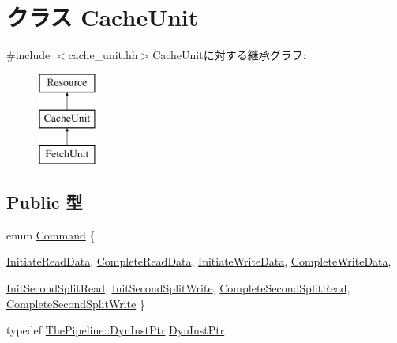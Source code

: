 \hypertarget{classCacheUnit}{
\section{クラス CacheUnit}
\label{classCacheUnit}
}


{\ttfamily \#include $<$cache\_\-unit.hh$>$}CacheUnitに対する継承グラフ:\begin{figure}[H]
\begin{center}
\leavevmode
\includegraphics[height=3cm]{classCacheUnit}
\end{center}
\end{figure}
\subsection*{Public 型}
\begin{DoxyCompactItemize}
\item 
enum \hyperlink{classCacheUnit_a2afce0a47a93eee73a314d53e4890153}{Command} \{ \par
\hyperlink{classCacheUnit_a2afce0a47a93eee73a314d53e4890153a073e15b510a5603d2befcbe896bd735e}{InitiateReadData}, 
\hyperlink{classCacheUnit_a2afce0a47a93eee73a314d53e4890153a4a1b5faa1ef065d02de5e8c06d8ea9c3}{CompleteReadData}, 
\hyperlink{classCacheUnit_a2afce0a47a93eee73a314d53e4890153aef4b28c5f1a2120dfb93f7613b5e12d7}{InitiateWriteData}, 
\hyperlink{classCacheUnit_a2afce0a47a93eee73a314d53e4890153a7a09943676cd675c7fc3ab19ad0c3d9a}{CompleteWriteData}, 
\par
\hyperlink{classCacheUnit_a2afce0a47a93eee73a314d53e4890153aaf47086f5466118f146d338e86976a99}{InitSecondSplitRead}, 
\hyperlink{classCacheUnit_a2afce0a47a93eee73a314d53e4890153a5a47a9fa564ced7a71887316685bc335}{InitSecondSplitWrite}, 
\hyperlink{classCacheUnit_a2afce0a47a93eee73a314d53e4890153ac69978bc7a301e20e323e43b35b3e9f1}{CompleteSecondSplitRead}, 
\hyperlink{classCacheUnit_a2afce0a47a93eee73a314d53e4890153a67738c183f321a947b53768e01b87a2c}{CompleteSecondSplitWrite}
 \}
\item 
typedef \hyperlink{classRefCountingPtr}{ThePipeline::DynInstPtr} \hyperlink{classCacheUnit_af9d0c8a46736ba6aa2d8bb94da1a5e73}{DynInstPtr}
\end{DoxyCompactItemize}
